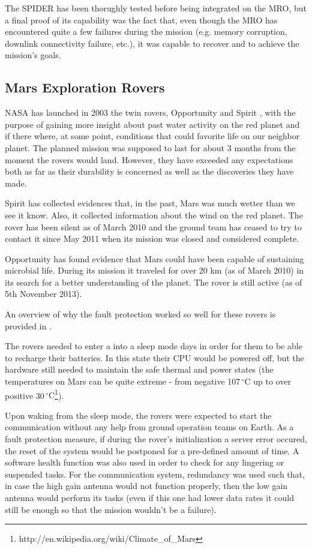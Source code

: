 The SPIDER has been thorughly tested before being integrated on the MRO, but a
final proof of its capability was the fact that, even though the MRO has
encountered quite a few failures during the mission (e.g. memory corruption,
downlink connectivity failure, etc.), it was capable to recover and to achieve
the mission's goals.

\subsection{Mars Exploration Rovers}

NASA has launched in 2003 the twin rovers, Opportunity and Spirit
\cite{mer-nasa}, with the purpose of gaining more insight about past water
activity on the red planet and if there where, at some point, conditions that
could favorite life on our neighbor planet. The planned mission was supposed to
last for about 3 months from the moment the rovers would land. However, they
have exceeded any expectations both as far as their durability is concerned as
well as the discoveries they have made.

Spirit has collected evidences that, in the past, Mars was much wetter than we
see it know. Also, it collected information about the wind on the red planet.
The rover has been silent as of March 2010 and the ground team has ceased to try
to contact it since May 2011 when its mission was closed and considered
complete.

Opportunity has found evidence that Mars could have been capable of sustaining
microbial life. During its mission it traveled for over 20 km (as of March 2010)
in its search for a better understanding of the planet. The rover is still
active (as of 5th November 2013).

An overview of why the fault protection worked so well for these rovers is
provided in \cite{surv-nasa-mars}.

The rovers needed to enter a into a sleep mode days in order for them to be able
to recharge their batteries. In this state their CPU would be powered off, but
the hardware still needed to maintain the safe thermal and power states (the
temperatures on Mars can be quite extreme - from negative
107$\,^{\circ}\mathrm{C}$ up to over positive
30$\,^{\circ}\mathrm{C}$\footnote{http://en.wikipedia.org/wiki/Climate\_of\_Mars}).

Upon waking from the sleep mode, the rovers were expected to start the
communication without any help from ground operation teams on Earth. As a fault
protection measure, if during the rover's initialization a server error occured,
the reset of the system would be postponed for a pre-defined amount of time. A
software health function was also used in order to check for any lingering or
suspended tasks. For the communication system, redundancy was used such that, in
case the high gain antenna would not function properly, then the low gain
antenna would perform its tasks (even if this one had lower data rates it could
still be enough so that the mission wouldn't be a failure).

